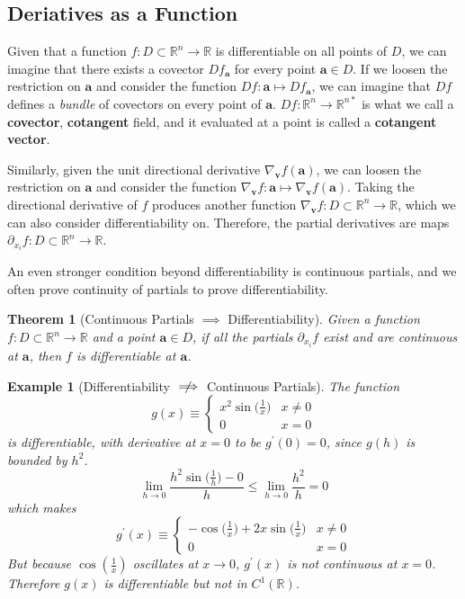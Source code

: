 \documentclass{article}
\newtheorem{theorem}{Theorem}[section]
\newtheorem{example}{Example}[section]
\theoremstyle{remark}
\theoremstyle{definition}
\begin{document}
\subsection{Deriatives as a Function}
Given that a function $f: D \subset \mathbb{R}^n \longrightarrow \mathbb{R}$ is differentiable on all points of $D$, we can imagine that there exists a covector $D f_\mathbf{a}$ for every point $\mathbf{a} \in D$. If we loosen the restriction on $\mathbf{a}$ and consider the function $D f: \mathbf{a} \mapsto D f_\mathbf{a}$, we can imagine that $D f$ defines a \textit{bundle} of covectors on every point of $\mathbf{a}$. $D f: \mathbb{R}^n \longrightarrow \mathbb{R}^{n*}$ is what we call a \textbf{covector}, \textbf{cotangent} field, and it evaluated at a point is called a \textbf{cotangent vector}. 

Similarly, given the unit directional derivative $\nabla_\mathbf{v} f(\mathbf{a})$, we can loosen the restriction on $\mathbf{a}$ and consider the function $\nabla_\mathbf{v} f: \mathbf{a} \mapsto \nabla_\mathbf{v} f(\mathbf{a})$. Taking the directional derivative of $f$ produces another function $\nabla_\mathbf{v} f: D \subset \mathbb{R}^n \longrightarrow \mathbb{R}$, which we can also consider differentiability on. Therefore, the partial derivatives are maps $\partial_{x_i} f: D \subset \mathbb{R}^n \longrightarrow \mathbb{R}$. 

An even stronger condition beyond differentiability is continuous partials, and we often prove continuity of partials to prove differentiability. 

\begin{theorem}[Continuous Partials $\implies$ Differentiability]
Given a function $f: D \subset \mathbb{R}^n \longrightarrow \mathbb{R}$ and a point $\mathbf{a} \in D$, if all the partials $\partial_{x_i} f$ exist and are continuous at $\mathbf{a}$, then $f$ is differentiable at $\mathbf{a}$. 
\end{theorem}

\begin{example}[Differentiability $\centernot \implies$ Continuous Partials]
The function 
\[g(x) \equiv \begin{cases}
x^2 \sin\Big(\frac{1}{x}\Big) & x \neq 0 \\
0 & x = 0
\end{cases}\]
is differentiable, with derivative at $x = 0$ to be $g^\prime(0) = 0$, since $g(h)$ is bounded by $h^2$. 
\[\lim_{h \rightarrow 0} \frac{h^2 \sin\big(\frac{1}{h}\big) - 0}{h} \leq \lim_{h \rightarrow 0} \frac{h^2}{h} = 0\]
which makes 
\[g^\prime (x) \equiv \begin{cases}
- \cos \Big( \frac{1}{x}\Big) + 2 x \sin\Big(\frac{1}{x}\Big) & x \neq 0 \\
0 & x = 0
\end{cases}\]
But because $\cos(\frac{1}{x})$ oscillates at $x \rightarrow 0$, $g^\prime (x)$ is not continuous at $x = 0$. Therefore $g(x)$ is differentiable but not in $C^1(\mathbb{R})$. 
\end{example}
\end{document}
